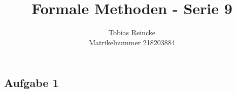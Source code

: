 \documentclass[]{article}
\title{Formale Methoden - Serie 9}
\author{Tobias Reincke \\ Matrikelnummer 218203884}
\date{}
\begin{document}
	\maketitle
	
\subsection*{Aufgabe 1}
		
\end{document}
